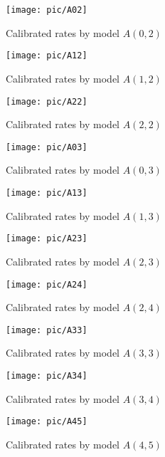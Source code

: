 \begin{figure}[H]
	\centering
	\texttt{[image: pic/A02]}
	\caption{Calibrated rates by model $A(0,2)$}
	\label{fig:A02}
\end{figure}

\begin{figure}[H]
	\centering
	\texttt{[image: pic/A12]}
	\caption{Calibrated rates by model $A(1,2)$}
	\label{fig:A12}
\end{figure}

\begin{figure}[H]
	\centering
	\texttt{[image: pic/A22]}
	\caption{Calibrated rates by model $A(2,2)$}
	\label{fig:A22}
\end{figure}

\begin{figure}[H]
	\centering
	\texttt{[image: pic/A03]}
	\caption{Calibrated rates by model $A(0,3)$}
	\label{fig:A03}
\end{figure}

\begin{figure}[H]
	\centering
	\texttt{[image: pic/A13]}
	\caption{Calibrated rates by model $A(1,3)$}
	\label{fig:A13}
\end{figure}

\begin{figure}[H]
	\centering
	\texttt{[image: pic/A23]}
	\caption{Calibrated rates by model $A(2,3)$}
	\label{fig:A23}
\end{figure}

\begin{figure}[H]
	\centering
	\texttt{[image: pic/A24]}
	\caption{Calibrated rates by model $A(2,4)$}
	\label{fig:A24}
\end{figure}

\begin{figure}[H]
	\centering
	\texttt{[image: pic/A33]}
	\caption{Calibrated rates by model $A(3,3)$}
	\label{fig:A33}
\end{figure}

\begin{figure}[H]
	\centering
	\texttt{[image: pic/A34]}
	\caption{Calibrated rates by model $A(3,4)$}
	\label{fig:A34}
\end{figure}

\begin{figure}[H]
	\centering
	\texttt{[image: pic/A45]}
	\caption{Calibrated rates by model $A(4,5)$}
	\label{fig:A45}
\end{figure}

